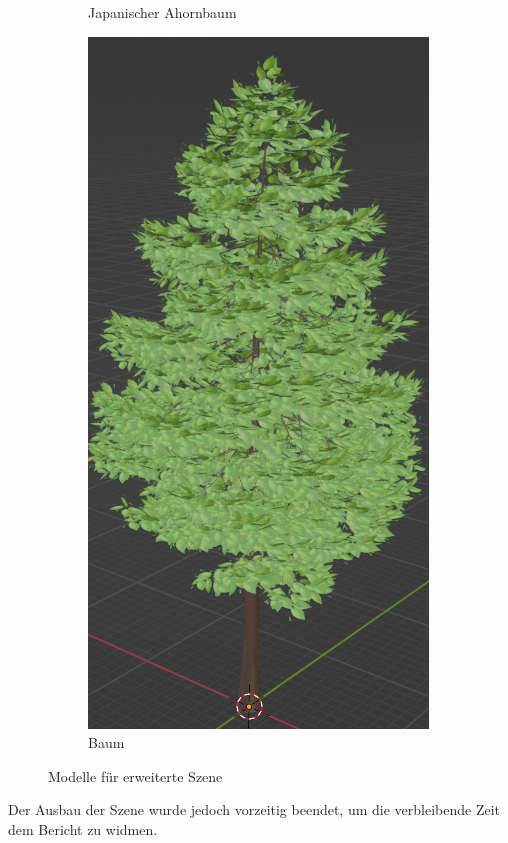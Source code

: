 \begin{figure}[H]
\begin{subfigure}{0.5\textwidth}
		\caption{Japanischer Ahornbaum}
	\end{subfigure}
	\begin{subfigure}{0.5\textwidth}
		\centering
		\includegraphics[height=0.3\pageheight,keepaspectratio]{pics/16}
		\caption{Baum}
	\end{subfigure}
	\caption{Modelle für erweiterte Szene}
\end{figure}
\par
Der Ausbau der Szene wurde jedoch vorzeitig beendet, um die verbleibende Zeit dem Bericht zu widmen.